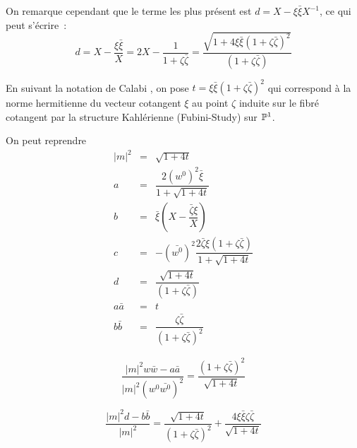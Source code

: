 \documentclass[a4paper,10pt]{article}
\begin{document}
On remarque cependant que le terme les plus présent est $d = X - \xi\bar{\xi}X^{-1}$, ce qui peut s'écrire~:
\[
d = X - \dfrac{\xi\bar{\xi}}{X} = 2X - \dfrac{1}{1+\zeta\bar{\zeta}}  = \dfrac{\sqrt{1+4\xi\bar{\xi}(1+\zeta\bar{\zeta})^2}}{(1+\zeta\bar{\zeta})}
\]

En suivant la notation de Calabi \cite{Calabi}, on pose $t = \xi\bar{\xi}(1+\zeta\bar{\zeta})^2$ qui correspond à la norme hermitienne du vecteur cotangent $\xi$ au point $\zeta$ induite sur le fibré cotangent par la structure Kahlérienne (Fubini-Study) sur $\mathbb{P}^1$.

On peut reprendre
\begin{eqnarray*}
|m|^2 & = & \sqrt{1+4t}\\
a & = &  \dfrac{2(w^0)^2\bar{\xi}}{1+\sqrt{1+4t}} \\
b & = & \bar{\xi}\left( X - \dfrac{\bar{\zeta}\xi}{X} \right) \\
c & = & -\left(\bar{w^0}\right)^2\dfrac{2\bar{\zeta}\xi(1+\zeta\bar{\zeta})}{1+\sqrt{1+4t}} \\
d & = &\dfrac{\sqrt{1+4t}}{(1+\zeta\bar{\zeta})}\\
a\bar{a} &=& t\\
b\bar{b} &=& \dfrac{\zeta\bar{\zeta}}{(1+\zeta\bar{\zeta})^2}
\end{eqnarray*}

\[
\dfrac{|m|^2w\bar{w}-a\bar{a}}{|m|^2(w^0\bar{w^0})^2}
 =
\dfrac{(1+\zeta\bar{\zeta})^2}{\sqrt{1+4t}}
\]

\[
\dfrac{|m|^2d-b\bar{b}}{|m|^2}
 =
 \dfrac{\sqrt{1+4t}}{(1+\zeta\bar{\zeta})^2} + \dfrac{4\xi\bar{\xi}\zeta\bar{\zeta}}{\sqrt{1+4t}}
\]
\end{document}
